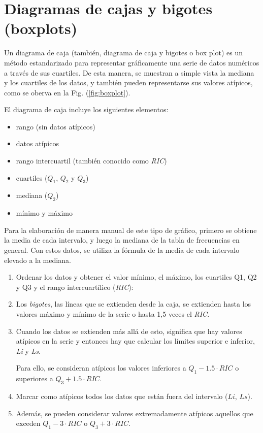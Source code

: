 \section{Diagramas de cajas y bigotes (boxplots)}

Un diagrama de caja (también, diagrama de caja y bigotes o box plot) es un
método estandarizado para representar gráficamente una serie de datos numéricos
a través de sus cuartiles. De esta manera, se muestran a simple vista la mediana
y los cuartiles de los datos, y también pueden representarse sus valores
atípicos, como se oberva en la Fig. (\ref{fig:boxplot}).

El diagrama de caja incluye los siguientes elementos:

\begin{itemize}
    \item rango (sin datos atípicos)
    \item datos atípicos
    \item rango intercuartil (también conocido como \textit{RIC})
    \item cuartiles ($Q_1$, $Q_2$ y $Q_3$)
    \item mediana ($Q_2$)
    \item mínimo y máximo
\end{itemize}

Para la elaboración de manera manual de este tipo de gráfico, primero se obtiene
la media de cada intervalo, y luego la mediana de la tabla de frecuencias en
general. Con estos datos, se utiliza la fórmula de la media de cada intervalo
elevado a la mediana.

\begin{enumerate}
\item Ordenar los datos y obtener el valor mínimo, el máximo, los cuartiles Q1,
Q2 y Q3 y el rango intercuartílico (\textit{RIC}):
\item Los \textit{bigotes}, las líneas que se extienden desde la caja, se
extienden hasta los valores máximo y mínimo de la serie o hasta 1,5 veces el
\textit{RIC}.
\item Cuando los datos se extienden más allá de esto, significa que hay valores
atípicos en la serie y entonces hay que calcular los límites superior e
inferior, \textit{Li} y \textit{Ls}.

Para ello, se consideran atípicos los valores inferiores a $Q_1-1.5 \cdot RIC$ o
superiores a $Q_3 + 1.5 \cdot RIC$.

\item Marcar como atípicos todos los datos que están fuera del intervalo ($Li$,
$Ls$).

\item Además, se pueden considerar valores extremadamente atípicos aquellos que
exceden $Q_1 - 3 \cdot RIC$ o $Q_3 + 3 \cdot RIC$.

\end{enumerate}

